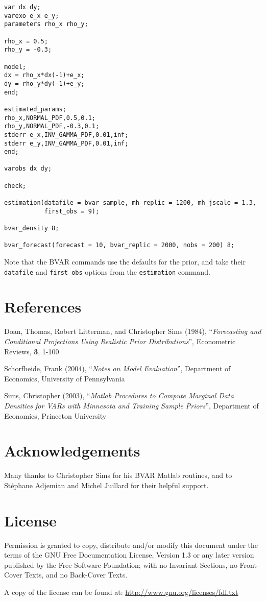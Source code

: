 \documentclass[10pt,a4paper]{article}
\begin{document}
\begin{verbatim}
var dx dy;
varexo e_x e_y;
parameters rho_x rho_y;

rho_x = 0.5;
rho_y = -0.3;

model;
dx = rho_x*dx(-1)+e_x;
dy = rho_y*dy(-1)+e_y;
end;

estimated_params;
rho_x,NORMAL_PDF,0.5,0.1;
rho_y,NORMAL_PDF,-0.3,0.1;
stderr e_x,INV_GAMMA_PDF,0.01,inf;
stderr e_y,INV_GAMMA_PDF,0.01,inf;
end;

varobs dx dy;

check;

estimation(datafile = bvar_sample, mh_replic = 1200, mh_jscale = 1.3,
           first_obs = 9);

bvar_density 8;

bvar_forecast(forecast = 10, bvar_replic = 2000, nobs = 200) 8;
\end{verbatim}

Note that the BVAR commands use the defaults for the prior, and take their \texttt{datafile} and \texttt{first\_obs} options from the \texttt{estimation} command.



\section*{References}

\noindent Doan, Thomas, Robert Litterman, and Christopher Sims (1984), ``\textit{Forecasting and Conditional Projections Using Realistic Prior Distributions}'', Econometric Reviews, \textbf{3}, 1-100

Schorfheide, Frank (2004), ``\textit{Notes on Model Evaluation}'', Department of Economics, University of Pennsylvania

Sims, Christopher (2003), ``\textit{Matlab Procedures to Compute Marginal Data Densities for VARs with Minnesota and Training Sample Priors}'', Department of Economics, Princeton University

\section*{Acknowledgements}

Many thanks to Christopher Sims for his BVAR Matlab routines, and to St\'ephane Adjemian and Michel Juillard for their helpful support.

\section*{License}

Permission is granted to copy, distribute and/or modify this document under the terms of the GNU Free Documentation License, Version 1.3 or any later version published by the Free Software Foundation; with no Invariant Sections, no Front-Cover Texts, and no Back-Cover Texts.

A copy of the license can be found at:
\url{http://www.gnu.org/licenses/fdl.txt}
\end{document}
